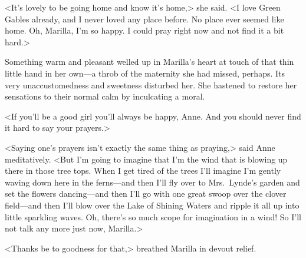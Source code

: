 <It's lovely to be going home and know it's home,> she said. <I love Green Gables already, and I never loved any place before. No place ever seemed like home. Oh, Marilla, I'm so happy. I could pray right now and not find it a bit hard.>

Something warm and pleasant welled up in Marilla's heart at touch of that thin little hand in her own—a throb of the maternity she had missed, perhaps. Its very unaccustomedness and sweetness disturbed her. She hastened to restore her sensations to their normal calm by inculcating a moral.

<If you'll be a good girl you'll always be happy, Anne. And you should never find it hard to say your prayers.>

<Saying one's prayers isn't exactly the same thing as praying,> said Anne meditatively. <But I'm going to imagine that I'm the wind that is blowing up there in those tree tops. When I get tired of the trees I'll imagine I'm gently waving down here in the ferns—and then I'll fly over to Mrs.~Lynde's garden and set the flowers dancing—and then I'll go with one great swoop over the clover field—and then I'll blow over the Lake of Shining Waters and ripple it all up into little sparkling waves. Oh, there's so much scope for imagination in a wind! So I'll not talk any more just now, Marilla.>

<Thanks be to goodness for that,> breathed Marilla in devout relief.

